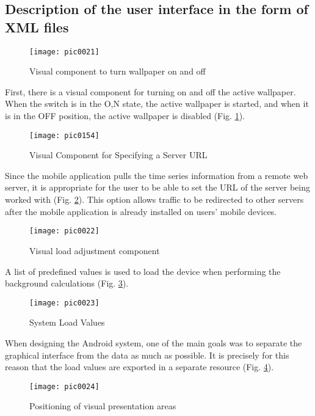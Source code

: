 \subsection{Description of the user interface in the form of XML files}

\begin{figure}[h]
\centering
\texttt{[image: pic0021]}
\caption{Visual component to turn wallpaper on and off}
\label{fig:pic0021}
\end{figure}
\FloatBarrier

First, there is a visual component for turning on and off the active wallpaper. When the switch is in the O,N state, the active wallpaper is started, and when it is in the OFF position, the active wallpaper is disabled (Fig. \ref{fig:pic0021}).

\begin{figure}[h]
\centering
\texttt{[image: pic0154]}
\caption{Visual Component for Specifying a Server URL}
\label{fig:pic0154}
\end{figure}
\FloatBarrier

Since the mobile application pulls the time series information from a remote web server, it is appropriate for the user to be able to set the URL of the server being worked with (Fig. \ref{fig:pic0154}). This option allows traffic to be redirected to other servers after the mobile application is already installed on users' mobile devices.

\begin{figure}[h]
\centering
\texttt{[image: pic0022]}
\caption{Visual load adjustment component}
\label{fig:pic0022}
\end{figure}
\FloatBarrier

A list of predefined values is used to load the device when performing the background calculations (Fig. \ref{fig:pic0022}).

\begin{figure}[h]
\centering
\texttt{[image: pic0023]}
\caption{System Load Values}
\label{fig:pic0023}
\end{figure}
\FloatBarrier

When designing the Android system, one of the main goals was to separate the graphical interface from the data as much as possible. It is precisely for this reason that the load values are exported in a separate resource (Fig. \ref{fig:pic0023}).

\begin{figure}[h]
\centering
\texttt{[image: pic0024]}
\caption{Positioning of visual presentation areas}
\label{fig:pic0024}
\end{figure}
\FloatBarrier

